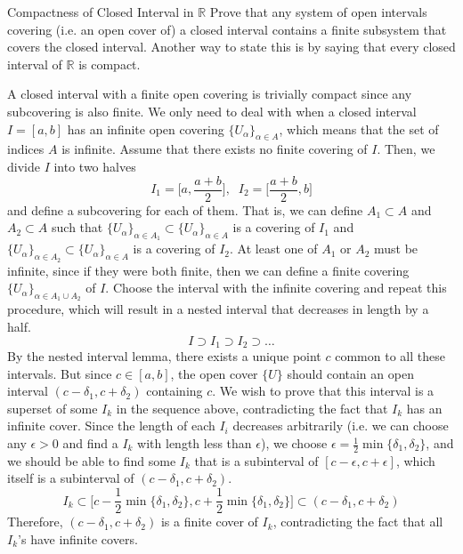 \documentclass{article}
\begin{document}
    \begin{exercise}{Compactness of Closed Interval in $\mathbb{R}$}
    Prove that any system of open intervals covering (i.e. an open cover of) a closed interval contains a finite subsystem that covers the closed interval. Another way to state this is by saying that every closed interval of $\mathbb{R}$ is compact. 
    \end{exercise}

    \begin{solution}
    A closed interval with a finite open covering is trivially compact since any subcovering is also finite. We only need to deal with when a closed interval $I = [a, b]$ has an infinite open covering $\{U_\alpha \}_{\alpha \in A}$, which means that the set of indices $A$ is infinite. Assume that there exists no finite covering of $I$. Then, we divide $I$ into two halves 
    \[I_1 = \Big[ a, \frac{a + b}{2}\Big], \;\; I_2 = \Big[ \frac{a + b}{2}, b \Big]\]
    and define a subcovering for each of them. That is, we can define $A_1 \subset A$ and $A_2 \subset A$ such that $\{U_\alpha\}_{\alpha \in A_1} \subset \{U_\alpha \}_{\alpha \in A}$ is a covering of $I_1$ and $\{U_\alpha\}_{\alpha \in A_2} \subset \{U_\alpha \}_{\alpha \in A}$ is a covering of $I_2$. At least one of $A_1$ or $A_2$ must be infinite, since if they were both finite, then we can define a finite covering $\{U_\alpha\}_{\alpha \in A_1 \cup A_2}$ of $I$. Choose the interval with the infinite covering and repeat this procedure, which will result in a nested interval that decreases in length by a half. 
    \[I \supset I_1 \supset I_2 \supset \ldots \]
    By the nested interval lemma, there exists a unique point $c$ common to all these intervals. But since $c \in [a, b]$, the open cover $\{U\}$ should contain an open interval $(c - \delta_1, c + \delta_2)$ containing $c$. We wish to prove that this interval is a superset of some $I_k$ in the sequence above, contradicting the fact that $I_k$ has an infinite cover. Since the length of each $I_i$ decreases arbitrarily (i.e. we can choose any $\epsilon > 0$ and find a $I_k$ with length less than $\epsilon$), we choose $\epsilon = \frac{1}{2} \min\{\delta_1, \delta_2 \}$, and we should be able to find some $I_k$ that is a subinterval of $[c - \epsilon, c + \epsilon]$, which itself is a subinterval of $(c - \delta_1, c + \delta_2)$. 
    \[I_k \subset \Big[ c - \frac{1}{2} \min\{\delta_1, \delta_2 \}, c + \frac{1}{2} \min\{\delta_1, \delta_2 \} \Big] \subset (c - \delta_1, c + \delta_2)\]
    Therefore, $(c - \delta_1, c + \delta_2)$ is a finite cover of $I_k$, contradicting the fact that all $I_k$'s have infinite covers. 
    \end{solution}
\end{document}
